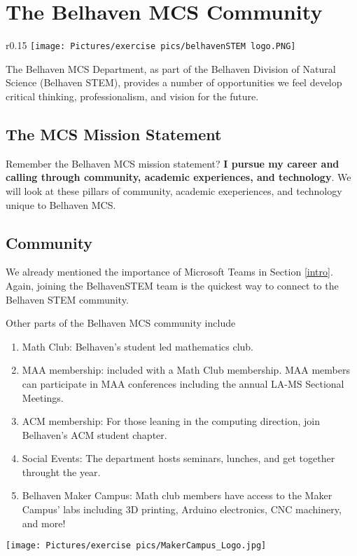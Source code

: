 
\section{The Belhaven MCS Community}

\begin{wrapfigure}{r}{0.15\textwidth} %
    \centering
    \texttt{[image: Pictures/exercise pics/belhavenSTEM logo.PNG]}
    \label{fig:belhavenstem}
\end{wrapfigure}

The Belhaven MCS Department, as part of the Belhaven Division of Natural Science (Belhaven STEM), provides a number of opportunities we feel develop critical thinking, professionalism, and vision for the future.

\subsection{The MCS Mission Statement}

Remember the Belhaven MCS mission statement? \textbf{I pursue my career and calling through community, academic experiences, and technology}. We will look at these pillars of community, academic exeperiences, and technology unique to Belhaven MCS.

\subsection{Community}

We already mentioned the importance of Microsoft Teams in Section \ref{intro}. Again, joining the BelhavenSTEM team is the quickest way to connect to the Belhaven STEM community.

\noindent Other parts of the Belhaven MCS community include\\

\begin{enumerate}
    \item Math Club: Belhaven's student led mathematics club. \\
    \item MAA membership: included with a Math Club membership. MAA members can participate in MAA conferences including the annual LA-MS Sectional Meetings.\\
    \item ACM membership: For those leaning in the computing direction, join Belhaven's ACM student chapter.\\
    \item Social Events: The department hosts seminars, lunches, and get together throught the year.\\
    \item Belhaven Maker Campus: Math club members have access to the Maker Campus' labs including 3D printing, Arduino electronics, CNC machinery, and more!
\end{enumerate}

\begin{center}
\texttt{[image: Pictures/exercise pics/MakerCampus\_Logo.jpg]}
\end{center}



